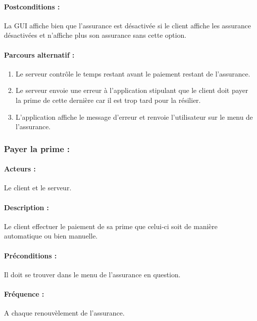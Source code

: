 \documentclass[../annexe.tex]{subfiles}
\begin{document}
\paragraph{Postconditions :}
		La GUI affiche bien que l'assurance est désactivée si le client affiche les assurance désactivées et n'affiche plus son assurance sans cette option.

\paragraph{Parcours alternatif :}
\begin{enumerate}
		\item Le serveur contrôle le temps restant avant le paiement restant de l'assurance.
		\item Le serveur envoie une erreur à l'application stipulant que le client doit payer la prime de cette dernière car il est trop tard pour la résilier.
		\item L'application affiche le message d'erreur et renvoie l'utilisateur sur le menu de l'assurance.
\end{enumerate}
\newpage

\subsubsection{Payer la prime :}
		
\paragraph{Acteurs :}
		Le client et le serveur.
\paragraph{Description :}
		Le client effectuer le paiement de sa prime que celui-ci soit de manière automatique ou bien manuelle.
\paragraph{Préconditions :}
		Il doit se trouver dans le menu de l'assurance en question.
\paragraph{Fréquence :}
		A chaque renouvèlement de l'assurance.
\end{document}
